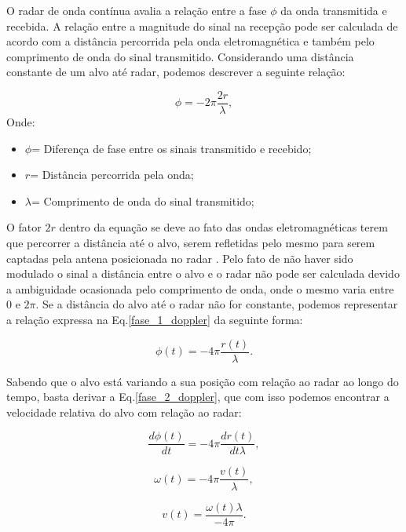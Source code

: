 O radar de onda contínua avalia a relação entre a fase $\phi$ da onda transmitida e recebida. A relação entre a magnitude do sinal na recepção pode ser calculada de acordo com a distância percorrida pela onda eletromagnética e também pelo comprimento de onda do sinal transmitido. Considerando uma distância constante de um alvo até radar, podemos descrever a seguinte relação: 

\begin{equation}
    \label{fase_1_doppler}
    \phi = -2\pi\frac{2r}{\lambda},
\end{equation}
Onde:
\begin{itemize}
    \item $\phi$= Diferença de fase entre os sinais transmitido e recebido;
    \item $r$= Distância percorrida pela onda;
    \item $\lambda$= Comprimento de onda do sinal transmitido;
\end{itemize}

O fator $2r$ dentro da equação se deve ao fato das ondas eletromagnéticas terem que percorrer a distância até o alvo, serem refletidas pelo mesmo para serem captadas pela antena posicionada no radar \cite{Doppler}. Pelo fato de não haver sido modulado o sinal a distância entre o alvo e o radar não pode ser calculada devido a ambiguidade ocasionada pelo comprimento de onda, onde o mesmo varia entre $0$ e $2\pi$. Se a distância do alvo até o radar não for constante, podemos representar a relação expressa na Eq.\ref{fase_1_doppler} da seguinte forma:

\begin{equation}
    \label{fase_2_doppler}
    \phi(t) = -4\pi\frac{r(t)}{\lambda}.
\end{equation}

Sabendo que o alvo está variando a sua posição com relação ao radar ao longo do tempo, basta derivar a Eq.\ref{fase_2_doppler}, que com isso podemos encontrar a velocidade relativa do alvo com relação ao radar:

\begin{equation}
    \label{fase_3_doppler}
    \frac{d\phi(t)}{dt} = -4\pi\frac{dr(t)}{dt\lambda},
\end{equation}

\begin{equation}
    \label{fase_4_doppler}
    \omega(t) = -4\pi\frac{v(t)}{\lambda},
\end{equation}

\begin{equation}
    \label{fase_5_doppler}
    v(t) = \frac{\omega(t)\lambda}{-4\pi}.
\end{equation}

